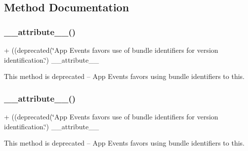 \subsection{Method Documentation}
\mbox{\label{interfaceFBSettings_a2e999eddc513423b7071f27bc09589aa}} 
\subsubsection{\texorpdfstring{\+\_\+\+\_\+attribute\+\_\+\+\_\+()}{\_\_attribute\_\_()}\hspace{0.1cm}{\footnotesize\ttfamily [1/5]}}
{\footnotesize\ttfamily + ((deprecated(\char`\"{}App Events favors use of bundle identifiers for version identification.\char`\"{}) \+\_\+\+\_\+attribute\+\_\+\+\_\+ \begin{DoxyParamCaption}{ }\end{DoxyParamCaption}}

This method is deprecated -- App Events favors using bundle identifiers to this. \mbox{\label{interfaceFBSettings_a2e999eddc513423b7071f27bc09589aa}} 
\subsubsection{\texorpdfstring{\+\_\+\+\_\+attribute\+\_\+\+\_\+()}{\_\_attribute\_\_()}\hspace{0.1cm}{\footnotesize\ttfamily [2/5]}}
{\footnotesize\ttfamily + ((deprecated(\char`\"{}App Events favors use of bundle identifiers for version identification.\char`\"{}) \+\_\+\+\_\+attribute\+\_\+\+\_\+ \begin{DoxyParamCaption}{ }\end{DoxyParamCaption}}

This method is deprecated -- App Events favors using bundle identifiers to this. \mbox{\label{interfaceFBSettings_a2e999eddc513423b7071f27bc09589aa}} 
